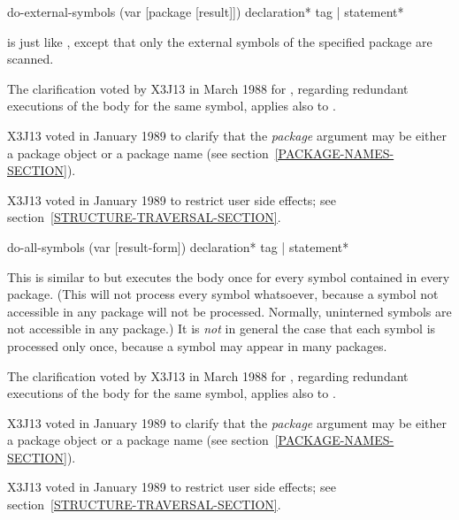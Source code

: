 \begin{defmac}
do-external-symbols (var [package [result]])
                    {declaration}* {tag | statement}*

 is just like , except that only
the external symbols of the specified package are scanned.
\begin{new}
The clarification voted by X3J13
in March 1988 for 
,
regarding redundant executions of the body for the same symbol,
applies also to .
\end{new}

\begin{new}
X3J13 voted in January 1989
to clarify that the \emph{package} argument may be either a package object
or a package name (see section~\ref{PACKAGE-NAMES-SECTION}).
\end{new}

\begin{new}
X3J13 voted in January 1989
to restrict user side effects; see section~\ref{STRUCTURE-TRAVERSAL-SECTION}.
\end{new}
\end{defmac}

\begin{defmac}
do-all-symbols (var [result-form])
               {declaration}* {tag | statement}*

This is similar to  but executes the body once for every
symbol contained in every package.  (This will not process every symbol
whatsoever, because a symbol not accessible in any package will not
be processed.  Normally, uninterned symbols are not accessible in any package.)
It is \emph{not} in general
the case that each symbol is processed only once, because a symbol may
appear in many packages.

\begin{new}
The clarification voted by X3J13
in March 1988 for 
,
regarding redundant executions of the body for the same symbol,
applies also to .
\end{new}

\begin{new}
X3J13 voted in January 1989
to clarify that the \emph{package} argument may be either a package object
or a package name (see section~\ref{PACKAGE-NAMES-SECTION}).
\end{new}

\begin{new}
X3J13 voted in January 1989
to restrict user side effects; see section~\ref{STRUCTURE-TRAVERSAL-SECTION}.
\end{new}
\end{defmac}

